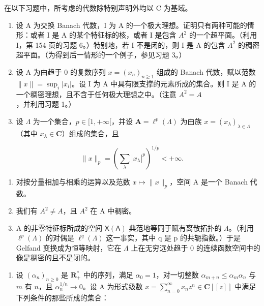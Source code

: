 
在以下习题中，所考虑的代数除特别声明外均以 C 为基域。

\begin{enumerate}
\def\labelenumi{\arabic{enumi})}
\item
  设 A 为交换 Banach 代数，I 为 A 的一个极大理想。证明只有两种可能的情形：或者 I 是 A 的某个特征标的核，或者 I 是包含 \(A^{2}\) 的一个超平面。（利用 I，第 154 页的习题 6。）特别地，若 I 不是闭的，则 I 是 A 的包含 \(A^{2}\) 的稠密超平面。（为得到后一情形的一个例子，参见习题 3。）
\item
  设 A 为由趋于 0 的复数序列 \(x = (x_{n})_{n \geqslant 1}\) 组成的 Banach 代数，赋以范数 \(\|x\| = \sup_{i} |x_{i}|\)。设 I 为 A 中具有限支撑的元素所成的集合。则 I 是 A 的一个稠密理想，且不含于任何极大理想之中。（注意 \(A^{2} = A\)，并利用习题 1。）
\item
  设 \(\Lambda\) 为一个集合，\(p \in [1, +\infty[\)，并设 \(\mathbf{A} = \ell^p(\Lambda)\) 为由族 \(x = (x_{\lambda})_{\lambda \in \Lambda}\)（其中 \(x_{\lambda} \in \mathbf{C}\)）组成的集合，且
\end{enumerate}

\[
\| x \| _ {p} = \left(\sum_ {\lambda} | x _ {\lambda} | ^ {p}\right) ^ {1 / p} <   + \infty .
\]

\begin{enumerate}
\def\labelenumi{\alph{enumi})}
\item
  对按分量相加与相乘的运算以及范数 \(x \mapsto \| x \|_p\)，空间 A 是一个 Banach 代数。
\item
  我们有 \(A^{2} \neq A\)，且 \(A^{2}\) 在 A 中稠密。
\item
  A 的非零特征标所成的空间 \(\mathsf{X}(\mathsf{A})\) 典范地等同于赋有离散拓扑的 \(\Lambda\)。（利用 \(\ell^{p}(\Lambda)\) 的对偶是 \(\ell^{q}(\Lambda)\) 这一事实，其中 q 是 p 的共轭指数。）于是 Gelfand 变换成为恒等映射，它在 \(\Lambda\) 上在无穷远处趋于 0 的连续函数空间中的像是稠密的且不是闭的。
\end{enumerate}

\begin{enumerate}
\def\labelenumi{\arabic{enumi})}
\setcounter{enumi}{3}
\tightlist
\item
  设 \((\alpha_{n})_{n\geqslant 0}\) 是 \(\mathbf{R}_{+}^{*}\) 中的序列，满足 \(\alpha_0 = 1\)，对一切整数 \(\alpha_{m + n}\leqslant \alpha_m\alpha_n\) 与 \(m\) 有 \(n\)，且 \(\alpha_{n}^{1 / n}\to 0\)。设 A 为形式级数 \(x = \sum_{n = 0}^{\infty}x_{n}z^{n}\in \mathbf{C}[[z]]\) 中满足下列条件的那些所成的集合：
\end{enumerate}

